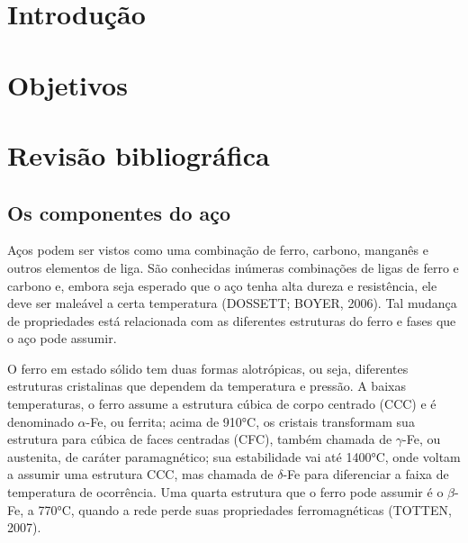 \documentclass[hidelinks,brazil,dissertacao,epusp]{usp}
\begin{document}






\elementospretextuais  %

\setlength\parindent{.85cm}  %

\chapter{Introdução}

\chapter{Objetivos}

\chapter{Revisão bibliográfica}

\section{Os componentes do aço}


Aços podem ser vistos como uma combinação de ferro, carbono, manganês e outros elementos de liga. São conhecidas inúmeras combinações de ligas de ferro e carbono e, embora seja esperado que o aço tenha alta dureza e resistência, ele deve ser maleável a certa temperatura (DOSSETT; BOYER, 2006). Tal mudança de propriedades está relacionada com as diferentes estruturas do ferro e fases que o aço pode assumir. 

O ferro em estado sólido tem duas formas alotrópicas, ou seja, diferentes estruturas cristalinas que dependem da temperatura e pressão. A baixas temperaturas, o ferro assume a estrutura cúbica de corpo centrado (CCC) e é denominado $\alpha$-Fe, ou ferrita; acima de 910°C, os cristais transformam sua estrutura para cúbica de faces centradas (CFC), também chamada de $\gamma$-Fe, ou austenita, de caráter paramagnético; sua estabilidade vai até 1400°C, onde voltam a assumir uma estrutura CCC, mas chamada de $\delta$-Fe para diferenciar a faixa de temperatura de ocorrência.  Uma quarta estrutura que o ferro pode assumir é o $\beta$-Fe, a 770°C, quando a rede perde suas propriedades ferromagnéticas (TOTTEN, 2007). 
\end{document}
